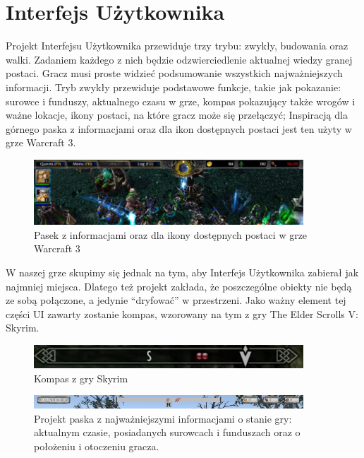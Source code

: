 \chapter{Interfejs Użytkownika}\label{chap:ui}

Projekt Interfejsu Użytkownika przewiduje trzy trybu: zwykły, budowania oraz walki. Zadaniem każdego z nich będzie odzwierciedlenie aktualnej wiedzy granej postaci. Gracz musi proste widzieć podsumowanie wszystkich najważniejszych informacji.
	Tryb zwykły przewiduje podstawowe funkcje, takie jak pokazanie:
surowce i funduszy,
aktualnego czasu w grze, 
kompas pokazujący także wrogów i ważne lokacje,
ikony postaci, na które gracz może się przełączyć;
Inspiracją dla górnego paska z informacjami  oraz dla ikon dostępnych postaci jest ten użyty w grze Warcraft 3.

\begin{figure}[htbp]
    \centering
    \includegraphics[width=0.9\textwidth]{images/ui/warcraft3.png}
    \caption{Pasek z informacjami oraz dla ikony dostępnych postaci w grze Warcraft 3}\label{fig:Warcraft3}
\end{figure}

W naszej grze skupimy się jednak na tym, aby Interfejs Użytkownika zabierał jak najmniej miejsca. Dlatego też projekt zakłada, że poszczególne obiekty nie będą ze sobą połączone, a jedynie “dryfować” w przestrzeni.
Jako ważny element tej części UI zawarty zostanie kompas, wzorowany na tym z gry The Elder Scrolls V: Skyrim.

\begin{figure}[htbp]
    \centering
    \includegraphics[width=0.9\textwidth]{images/ui/compassSkyrim.png}
    \caption{Kompas z gry Skyrim}\label{fig:Fallout}
\end{figure}


\begin{figure}[htbp]
    \centering
    \includegraphics[width=0.9\textwidth]{images/ui/naszpasek.png}
    \caption{Projekt paska z najważniejszymi informacjami o stanie gry: aktualnym czasie, posiadanych surowcach i funduszach oraz o położeniu i otoczeniu gracza.
    }\label{fig:compass}
\end{figure}
 

